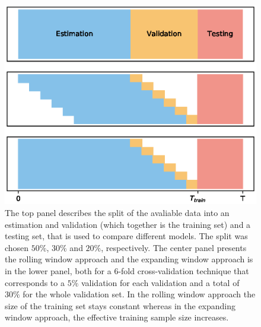 \begin{figure}
    \begin{center}
        \includegraphics[width=\textwidth]{Plots/RollingExpandingWindow.eps}
    \end{center}
    \caption{The top panel describes the split of the avaliable data into an estimation and validation (which together is the training set) and a testing set, that is used to compare different models. The split was chosen $50\%$, $30\%$ and $20\%$, respectively. The center panel presents the rolling window approach and the expanding window approach is in the lower panel, both for a $6$-fold cross-validation technique that corresponds to a $5\%$ validation for each validation and a total of $30\%$ for the whole validation set. In the rolling window approach the size of the training set stays constant whereas in the expanding window approach, the effective training sample size increases.}
    \label{FIG:RollingExpanding}
\end{figure}


